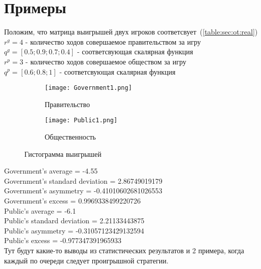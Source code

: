 \section{Примеры} 
Положим, что матрица выигрышей двух игроков соответсвует~(\ref{table:sec:ot:real})
$r^g= 4 $ - количество ходов совершаемое  правительством за игру\\
$q^g =[ 0.5; 0.9; 0.7; 0.4 ]$ - соответсвующая скалярная функция \\
$r^p= 3 $ - количество ходов совершаемое  обществом за игру\\
$q^p=[ 0.6; 0.8; 1] $ - соответсвующая скалярная функция \\

\begin{figure}[h]
	
	\begin{subfigure}{0.5\textwidth}
		\texttt{[image: Government1.png]} 
		\caption{Правительство}
		\label{fig:government1}
	\end{subfigure}
	\begin{subfigure}{0.5\textwidth}
		\texttt{[image: Public1.png]}
		\caption{Общественность}
		\label{fig:public2}
	\end{subfigure}
	
	\caption{Гистограмма выигрышей}
	\label{fig:stat1}
\end{figure}
Government's average = -4.55\\
Government's standard deviation = 2.86749019179\\
Government's asymmetry = -0.41010602681026553\\
Government's excess = 0.9969338499220726\\
Public's average = -6.1\\
Public's standard deviation = 2.21133443875\\
Public's asymmetry = -0.31057123429132594\\
Public's excess = -0.977347391965933\\

Тут будут какие-то выводы из статистических результатов и 2 примера, когда каждый по очереди следует проигрышной стратегии.
